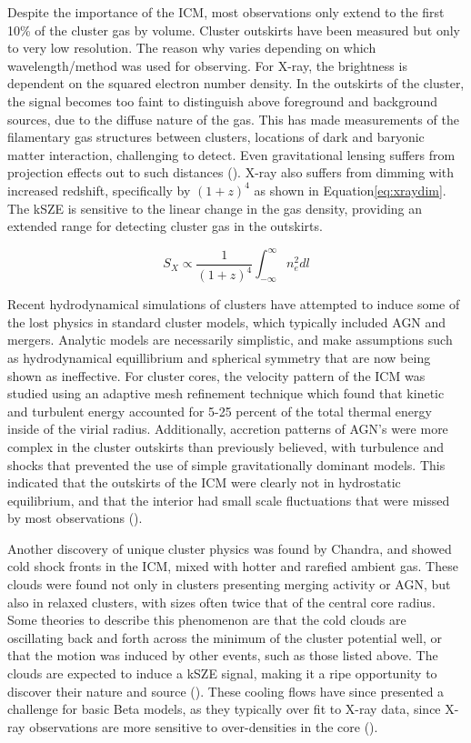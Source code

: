 \documentclass[manuscript]{aastex}
\begin{document}
Despite the importance of the ICM, most observations only extend to the first 10\% of the cluster gas by volume. Cluster outskirts have been measured but only to very low resolution. The reason why varies depending on which wavelength/method was used for observing. For X-ray, the brightness is dependent on the squared electron number density. In the outskirts of the cluster, the signal becomes too faint to distinguish above foreground and background sources, due to the diffuse nature of the gas.  This has made measurements of the filamentary gas structures between clusters, locations of dark and baryonic matter interaction, challenging to detect. Even gravitational lensing suffers from projection effects out to such distances (\cite{Reiprich2013}). X-ray also suffers from dimming with increased redshift, specifically by \((1+z)^{4}\) as shown in Equation\ref{eq:xraydim}. The kSZE is sensitive to the linear change in the gas density, providing an extended range for detecting cluster gas in the outskirts. 

\begin{equation}\label{eq:xraydim}
S_{X} \propto \frac{1}{(1+z)^4} \int^{\infty}_{-\infty}  n_{e}^{2} dl
\end{equation}

Recent hydrodynamical simulations of clusters have attempted to induce some of the lost physics in standard cluster models, which typically included AGN and mergers. Analytic models are necessarily simplistic,  and make assumptions such as hydrodynamical equillibrium and spherical symmetry that are now being shown as ineffective. For cluster cores, the velocity pattern of the ICM was studied using an adaptive mesh refinement technique which found that kinetic and turbulent energy accounted for 5-25 percent of the total thermal energy inside of the virial radius. Additionally, accretion patterns of AGN's were more complex in the cluster outskirts than previously believed, with turbulence and shocks that prevented the use of simple gravitationally dominant models. This indicated that the outskirts of the ICM were clearly not in hydrostatic equilibrium, and that the interior had small scale fluctuations that were missed by most observations (\cite{Reiprich2013}).  

Another discovery of unique cluster physics was found by Chandra, and showed cold shock fronts in the ICM, mixed with hotter and rarefied ambient gas. These clouds were found not only in clusters presenting merging activity or AGN, but also in relaxed clusters, with sizes often twice that of the central core radius. Some theories to describe this phenomenon are that the cold clouds are oscillating back and forth across the minimum of the cluster potential well, or that the motion was induced by other events, such as those listed above. The clouds are expected to induce a kSZE signal, making it a ripe opportunity to discover their nature and source (\cite{Diego2003}). These cooling flows have since presented a challenge for basic Beta models, as they typically over fit to X-ray data, since X-ray observations are more sensitive to over-densities in the core (\cite{Benson2003}). 
\end{document}
